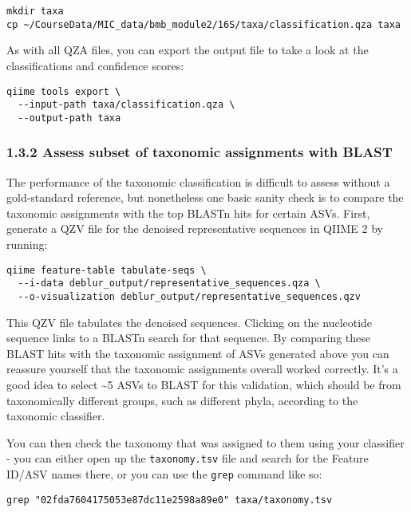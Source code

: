\documentclass[
]{book}
\begin{document}
\begin{verbatim}
mkdir taxa      
cp ~/CourseData/MIC_data/bmb_module2/16S/taxa/classification.qza taxa
\end{verbatim}

As with all QZA files, you can export the output file to take a look at the classifications and confidence scores:

\begin{verbatim}
qiime tools export \
  --input-path taxa/classification.qza \
  --output-path taxa
\end{verbatim}

\subsubsection{1.3.2 Assess subset of taxonomic assignments with BLAST}\label{assess-subset-of-taxonomic-assignments-with-blast}

The performance of the taxonomic classification is difficult to assess without a gold-standard reference, but nonetheless one basic sanity check is to compare the taxonomic assignments with the top BLASTn hits for certain ASVs. First, generate a QZV file for the denoised representative sequences in QIIME 2 by running:

\begin{verbatim}
qiime feature-table tabulate-seqs \
  --i-data deblur_output/representative_sequences.qza \
  --o-visualization deblur_output/representative_sequences.qzv
\end{verbatim}

This QZV file tabulates the denoised sequences. Clicking on the nucleotide sequence links to a BLASTn search for that sequence. By comparing these BLAST hits with the taxonomic assignment of ASVs generated above you can reassure yourself that the taxonomic assignments overall worked correctly. It's a good idea to select \textasciitilde5 ASVs to BLAST for this validation, which should be from taxonomically different groups, such as different phyla, according to the taxonomic classifier.

You can then check the taxonomy that was assigned to them using your classifier - you can either open up the \texttt{taxonomy.tsv} file and search for the Feature ID/ASV names there, or you can use the \texttt{grep} command like so:

\begin{verbatim}
grep "02fda7604175053e87dc11e2598a89e0" taxa/taxonomy.tsv
\end{verbatim}
\end{document}
